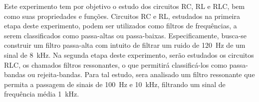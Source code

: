 Este experimento tem por objetivo o estudo dos circuitos RC, RL e RLC, bem como suas propriedades e funções. Circuitos RC e RL, estudados na primeira etapa deste experimento, podem ser utilizados como filtros de frequências, a serem classificados como passa-altas ou passa-baixas. Especificamente, busca-se construir um filtro passa-alta com intuito de filtrar um ruido de \SI{120}{\hertz} de um sinal de \SI{8}{\kilo\hertz}. Na segunda etapa deste experimento, serão estudados os circuitos RLC, os chamados filtros ressonantes, o que permitirá classificá-los como passa-bandas ou rejeita-bandas. Para tal estudo, sera analisado um filtro ressonante que permita a passagem de sinais de  \SI{100}{\hertz} e \SI{10}{\kilo\hertz}, filtrando um sinal de frequência média \SI{1}{\kilo\hertz}.

